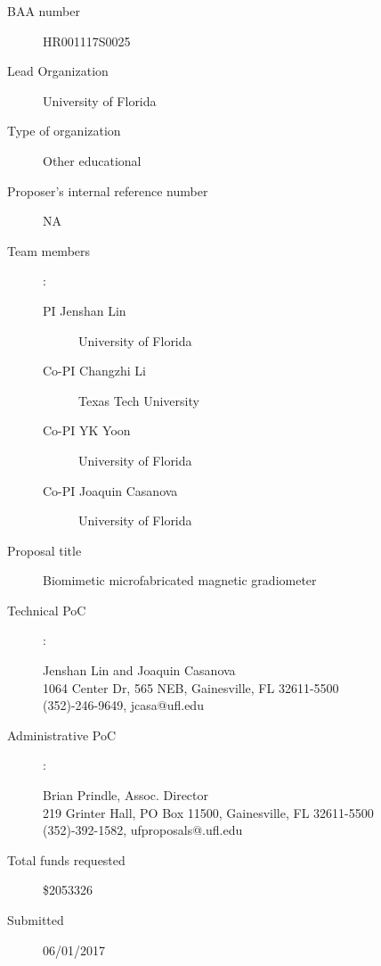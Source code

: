 
\begin{description}
\item [BAA number] HR001117S0025
\item [Lead Organization] University of Florida
\item [Type of organization] Other educational
\item [Proposer’s internal reference number] NA
\item [Team members]:
  \begin{description}
  \item [PI Jenshan Lin] University of Florida 
  \item [Co-PI Changzhi Li] Texas Tech University
  \item [Co-PI YK Yoon] University of Florida 
  \item [Co-PI Joaquin Casanova] University of Florida 
  \end{description}
\item [Proposal title] Biomimetic microfabricated magnetic gradiometer
\item [Technical PoC]:
  \begin{description}
  \item [Jenshan Lin and Joaquin Casanova]
  \item [1064 Center Dr, 565 NEB, Gainesville, FL 32611-5500]
  \item [(352)-246-9649, jcasa@ufl.edu]
  \end{description}
\item [Administrative PoC]:
  \begin{description}
  \item [Brian Prindle, Assoc. Director]
  \item [219 Grinter Hall, PO Box 11500, Gainesville, FL 32611-5500]
  \item [(352)-392-1582, ufproposals@.ufl.edu]
  \end{description}
\item [Total funds requested] \$2053326
\item [Submitted] 06/01/2017
\end{description}

